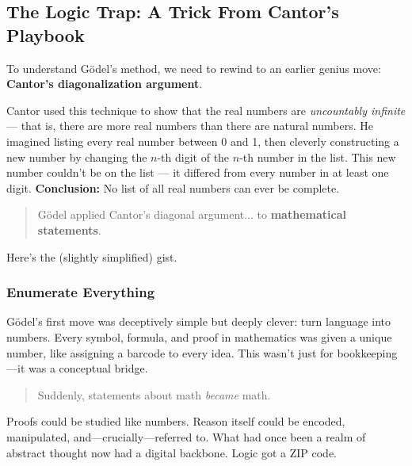 \subsection{The Logic Trap: A Trick From Cantor’s Playbook}

To understand Gödel’s method, we need to rewind to an earlier genius move: \textbf{Cantor’s diagonalization argument}.

Cantor used this technique to show that the real numbers are \emph{uncountably infinite} — that is, there are more real numbers than there are natural numbers. He imagined listing every real number between 0 and 1, then cleverly constructing a new number by changing the $n$-th digit of the $n$-th number in the list. This new number couldn’t be on the list — it differed from every number in at least one digit. \textbf{Conclusion:} No list of all real numbers can ever be complete.

\begin{quote}
Gödel applied Cantor's diagonal argument... to \textbf{mathematical statements}.
\end{quote}

Here’s the (slightly simplified) gist.

\subsubsection{Enumerate Everything} 

Gödel’s first move was deceptively simple but deeply clever: turn language into numbers. Every symbol, formula, and proof in mathematics was given a unique number, like assigning a barcode to every idea. This wasn't just for bookkeeping—it was a conceptual bridge. 

\begin{quote}
Suddenly, statements about math \emph{became} math. 
\end{quote}

Proofs could be studied like numbers. Reason itself could be encoded, manipulated, and—crucially—referred to. What had once been a realm of abstract thought now had a digital backbone. Logic got a ZIP code.


\vspace{1em}

